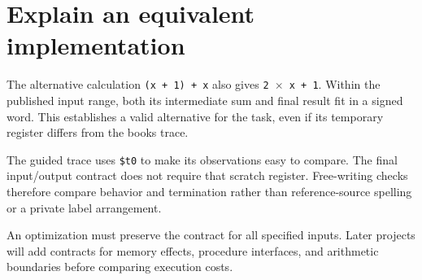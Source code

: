 \section{Explain an equivalent
  implementation}\label{001-console-calculation-p21-explain-an-equivalent-implementation}

The alternative calculation \texttt{(x\ +\ 1)\ +\ x} also gives
\texttt{2\ \ensuremath{\times}\ x\ +\ 1}. Within the published input range, both its
intermediate sum and final result fit in a signed word. This establishes
a valid alternative for the task, even if its temporary register differs
from the book\textquotesingle s trace.

The guided trace uses \texttt{\$t0} to make its observations easy to
compare. The final input/output contract does not require that scratch
register. Free-writing checks therefore compare behavior and termination
rather than reference-source spelling or a private label arrangement.

An optimization must preserve the contract for all specified inputs.
Later projects will add contracts for memory effects, procedure
interfaces, and arithmetic boundaries before comparing execution costs.

